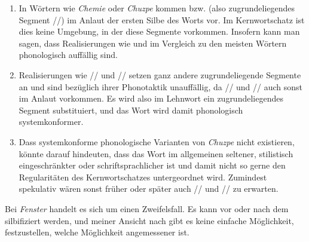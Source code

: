 \begin{enumerate}\Lf
  \item In Wörtern wie \textit{Chemie} oder \textit{Chuzpe} kommen \textipa{[\c{c}]} bzw. \textipa{[X]} (also zugrundeliegendes Segment //) im Anlaut der ersten Silbe des Worts vor.
    Im Kernwortschatz ist dies keine Umgebung, in der diese Segmente vorkommen.
    Insofern kann man sagen, dass Realisierungen wie \textipa{[XU\t{ts}p@]} und \textipa{[\c{c}emi:]} im Vergleich zu den meisten Wörtern phonologisch auffällig sind.
  \item Realisierungen wie // und // setzen ganz andere zugrundeliegende Segmente an und sind bezüglich ihrer Phonotaktik unauffällig, da // und // auch sonst im Anlaut vorkommen.
    Es wird also im Lehnwort ein zugrundeliegendes Segment substituiert, und das Wort wird damit phonologisch systemkonformer.
  \item Dass systemkonforme phonologische Varianten von \textit{Chuzpe} nicht existieren, könnte darauf hindeuten, dass das Wort im allgemeinen seltener, stilistisch eingeschränkter oder schriftsprachlicher ist und damit nicht so gerne den Regularitäten des Kernwortschatzes untergeordnet wird.
    Zumindest spekulativ wären sonst früher oder später auch // und // zu erwarten.
\end{enumerate}


Bei \textit{Fenster} handelt es sich um einen Zweifelsfall.
Es kann vor oder nach dem \textipa{[s]} silbifiziert werden, und meiner Ansicht nach gibt es keine einfache Möglichkeit, festzustellen, welche Möglichkeit angemessener ist.

